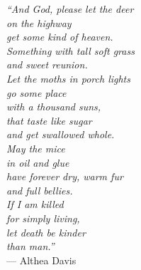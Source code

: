 \begin{epigrafe}
   \vspace*{\fill}
   \begin{flushright}
      \textit{
         ``And God, please let the deer\\
         on the highway\\
         get some kind of heaven.\\
         Something with tall soft grass\\
         and sweet reunion.\\[8pt]
         Let the moths in porch lights\\
         go some place\\
         with a thousand suns,\\
         that taste like sugar\\
         and get swallowed whole.\\[8pt]
         May the mice\\
         in oil and glue\\
         have forever dry, warm fur\\
         and full bellies.\\[8pt]
         If I am killed\\
         for simply living,\\
         let death be kinder\\
         than man.''
      }
      \\[6pt]
      --- Althea Davis
   \end{flushright}
   \vspace*{\fill}
\end{epigrafe}